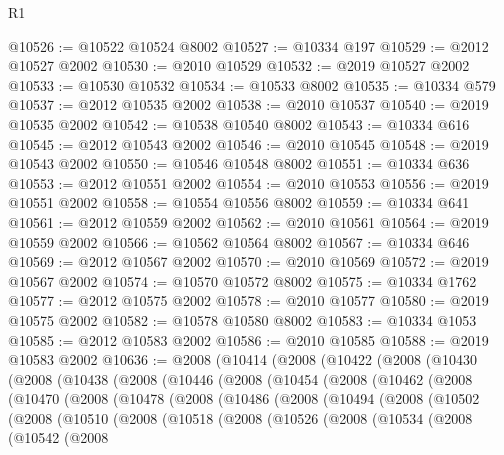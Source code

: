 \begin{lexlean}{R1}
\begin{coremodule}
@10526 := @10522 @10524 @8002
@10527 := @10334 @197
@10529 := @2012 @10527 @2002
@10530 := @2010 @10529
@10532 := @2019 @10527 @2002
@10533 := @10530 @10532
@10534 := @10533 @8002
@10535 := @10334 @579
@10537 := @2012 @10535 @2002
@10538 := @2010 @10537
@10540 := @2019 @10535 @2002
@10542 := @10538 @10540 @8002
@10543 := @10334 @616
@10545 := @2012 @10543 @2002
@10546 := @2010 @10545
@10548 := @2019 @10543 @2002
@10550 := @10546 @10548 @8002
@10551 := @10334 @636
@10553 := @2012 @10551 @2002
@10554 := @2010 @10553
@10556 := @2019 @10551 @2002
@10558 := @10554 @10556 @8002
@10559 := @10334 @641
@10561 := @2012 @10559 @2002
@10562 := @2010 @10561
@10564 := @2019 @10559 @2002
@10566 := @10562 @10564 @8002
@10567 := @10334 @646
@10569 := @2012 @10567 @2002
@10570 := @2010 @10569
@10572 := @2019 @10567 @2002
@10574 := @10570 @10572 @8002
@10575 := @10334 @1762
@10577 := @2012 @10575 @2002
@10578 := @2010 @10577
@10580 := @2019 @10575 @2002
@10582 := @10578 @10580 @8002
@10583 := @10334 @1053
@10585 := @2012 @10583 @2002
@10586 := @2010 @10585
@10588 := @2019 @10583 @2002
@10636 := @2008
    (@10414
      (@2008
        (@10422
          (@2008
            (@10430
              (@2008
                (@10438
                  (@2008
                    (@10446
                      (@2008
                        (@10454
                          (@2008
                            (@10462
                              (@2008
                                (@10470
                                  (@2008
                                    (@10478
                                      (@2008
                                        (@10486
                                          (@2008
                                            (@10494
                                              (@2008
                                                (@10502
                                                  (@2008
                                                    (@10510
                                                      (@2008
                                                        (@10518
                                                          (@2008
                                                            (@10526
                                                              (@2008
                                                                (@10534
                                                                  (@2008
                                                                    (@10542
                                                                      (@2008

\end{coremodule}
\end{lexlean}
